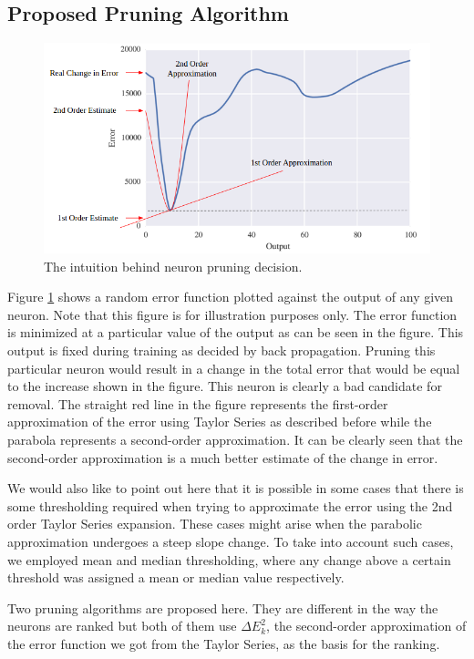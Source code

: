 \subsection{Proposed Pruning Algorithm}
\begin{figure}
  \includegraphics[width=\linewidth]{intuition.png}
  \caption{The intuition behind neuron pruning decision.}
  \label{fig:intuition}
\end{figure}

Figure \ref{fig:intuition} shows a random error function plotted against the output of any given neuron. Note that this figure is for illustration purposes only. The error function is minimized at a particular value of the output as can be seen in the figure. This output is fixed during training as decided by back propagation. Pruning this particular neuron would result in a change in the total error that would be equal to the increase shown in the figure. This neuron is clearly a bad candidate for removal. The straight red line in the figure represents the first-order approximation of the error using Taylor Series as described before while the parabola represents a second-order approximation. It can be clearly seen that the second-order approximation is a much better estimate of the change in error.

We would also like to point out here that it is possible in some cases that there is some thresholding required when trying to approximate the error using the 2nd order Taylor Series expansion. These cases might arise when the parabolic approximation undergoes a steep slope change. To take into account such cases, we employed mean and median thresholding, where any change above a certain threshold was assigned a mean or median value respectively.

Two pruning algorithms are proposed here. They are different in the way the neurons are ranked but both of them use $\Delta E_{k}^2$, the second-order approximation of the error function we got from the Taylor Series, as the basis for the ranking.

